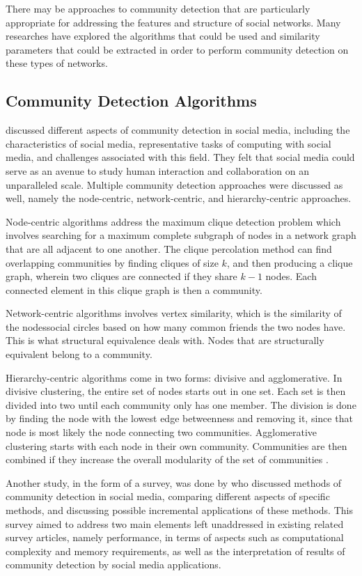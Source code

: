 There may be approaches to community detection that are particularly appropriate for addressing the features and structure of social networks. Many researches have explored the algorithms that could be used and similarity parameters that could be extracted in order to perform community detection on these types of networks.


\subsection{Community Detection Algorithms}


 discussed different aspects of community detection in social media, including the characteristics of social media, representative tasks of computing with social media, and challenges associated with this field. They felt that social media could serve as an avenue to study human interaction and collaboration on an unparalleled scale. Multiple community detection approaches were discussed as well, namely the node-centric, network-centric, and hierarchy-centric approaches.


Node-centric algorithms address the maximum clique detection problem which involves searching for a maximum complete subgraph of nodes in a network graph that are all adjacent to one another. The clique percolation method can find overlapping communities by finding cliques of size $k$, and then producing a clique graph, wherein two cliques are connected if they share $k-1$ nodes. Each connected element in this clique graph is then a community.


Network-centric algorithms involves vertex similarity, which is the similarity of the nodes\vtick  social circles based on how many common friends the two nodes have. This is what structural equivalence deals with. Nodes that are structurally equivalent belong to a community. 


Hierarchy-centric algorithms come in two forms: divisive and agglomerative. In divisive clustering, the entire set of nodes starts out in one set. Each set is then divided into two until each community only has one member. The division is done by finding the node with the lowest edge betweenness and removing it, since that node is most likely the node connecting two communities. Agglomerative clustering starts with each node in their own community. Communities are then combined if they increase the overall modularity of the set of communities \cite{Tang:2010}.


Another study, in the form of a survey, was done by  who discussed methods of community detection in social media, comparing different aspects of specific methods, and discussing possible incremental applications of these methods. This survey aimed to address two main elements left unaddressed in existing related survey articles, namely performance, in terms of aspects such as computational complexity and memory requirements, as well as the interpretation of results of community detection by social media applications.



